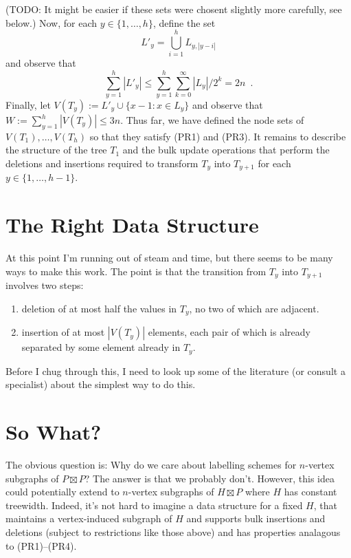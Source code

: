 \documentclass[kpfonts]{patmorin}
\begin{document}
(TODO: It might be easier if these sets were chosent slightly more carefully, see below.)
Now, for each $y\in\{1,\ldots,h\}$, define the set 
\[    L'_y = \bigcup_{i=1}^h L_{y,|y-i|} \]
and observe that
\[
   \sum_{y=1}^h |L'_y| \le \sum_{y=1}^h \sum_{k=0}^{\infty}|L_y|/2^k = 2n \enspace .
\]
Finally, let $V(T_y):= L'_y\cup \{x-1: x\in L_y\}$ and observe that $W:=\sum_{y=1}^h |V(T_y)| \le 3n$.  Thus far, we have defined the node sets of $V(T_1),\ldots,V(T_h)$ so that they satisfy (PR1) and (PR3).  It remains to describe the structure of the tree $T_1$ and the bulk update operations that perform the deletions and insertions required to transform $T_y$ into $T_{y+1}$ for each $y\in\{1,\ldots,h-1\}$.

\section{The Right Data Structure}

At this point I'm running out of steam and time, but there seems to be many ways to make this work.  The point is that the transition from $T_y$ into $T_{y+1}$ involves two steps:
\begin{enumerate}
  \item deletion of at most half the values in $T_y$, no two of which are adjacent.
  \item insertion of at most $|V(T_y)|$ elements, each pair of which is already separated by some element already in $T_y$.
\end{enumerate}
Before I chug through this, I need to look up some of the literature (or consult a specialist) about the simplest way to do this.

\section{So What?}

The obvious question is: Why do we care about labelling schemes for $n$-vertex subgraphs of $P\boxtimes P$? The answer is that we probably don't.  However, this idea could potentially extend to $n$-vertex subgraphs of $H\boxtimes P$ where $H$ has constant treewidth.  Indeed, it's not hard to imagine a data structure for a fixed $H$, that maintains a vertex-induced subgraph of $H$ and supports bulk insertions and deletions (subject to restrictions like those above) and has properties analagous to (PR1)--(PR4).









% 
% 
% 
% 
% 
\end{document}
